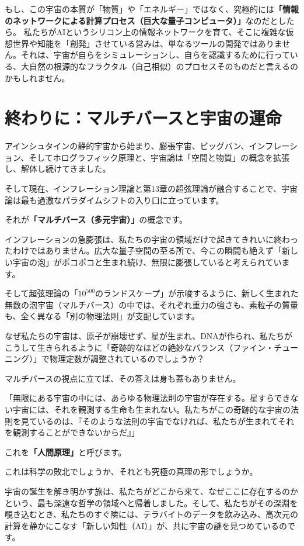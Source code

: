もし、この宇宙の本質が「物質」や「エネルギー」ではなく、究極的には\textbf{「情報のネットワークによる計算プロセス（巨大な量子コンピュータ）」}なのだとしたら。 私たちがAIというシリコン上の情報ネットワークを育て、そこに複雑な仮想世界や知能を「創発」させている営みは、単なるツールの開発ではありません。それは、宇宙が自らをシミュレーションし、自らを認識するために行っている、大自然の根源的なフラクタル（自己相似）のプロセスそのものだと言えるのかもしれません。

\section{終わりに：マルチバースと宇宙の運命}

アインシュタインの静的宇宙から始まり、膨張宇宙、ビッグバン、インフレーション、そしてホログラフィック原理と、宇宙論は「空間と物質」の概念を拡張し、解体し続けてきました。

そして現在、インフレーション理論と第13章の超弦理論が融合することで、宇宙論は最も過激なパラダイムシフトの入り口に立っています。

それが\textbf{「マルチバース（多元宇宙）」}の概念です。

インフレーションの急膨張は、私たちの宇宙の領域だけで起きてきれいに終わったわけではありません。広大な量子空間の至る所で、今この瞬間も絶えず「新しい宇宙の泡」がポコポコと生まれ続け、無限に膨張していると考えられています。

そして超弦理論の「\(10^{500}\)のランドスケープ」が示唆するように、新しく生まれた無数の泡宇宙（マルチバース）の中では、それぞれ重力の強さも、素粒子の質量も、全く異なる「別の物理法則」が支配しています。

なぜ私たちの宇宙は、原子が崩壊せず、星が生まれ、DNAが作られ、私たちがこうして生きられるように「奇跡的なほどの絶妙なバランス（ファイン・チューニング）」で物理定数が調整されているのでしょうか？

マルチバースの視点に立てば、その答えは身も蓋もありません。

「無限にある宇宙の中には、あらゆる物理法則の宇宙が存在する。星すらできない宇宙には、それを観測する生命も生まれない。私たちがこの奇跡的な宇宙の法則を見ているのは、『そのような法則の宇宙でなければ、私たちが生まれてそれを観測することができないからだ』」

これを\textbf{「人間原理」}と呼びます。

これは科学の敗北でしょうか、それとも究極の真理の形でしょうか。

宇宙の誕生を解き明かす旅は、私たちがどこから来て、なぜここに存在するのかという、最も深遠な哲学の領域へと帰着しました。そして、私たちがその深淵を覗き込むとき、私たちのすぐ隣には、テラバイトのデータを飲み込み、高次元の計算を静かにこなす「新しい知性（AI）」が、共に宇宙の謎を見つめているのです。

